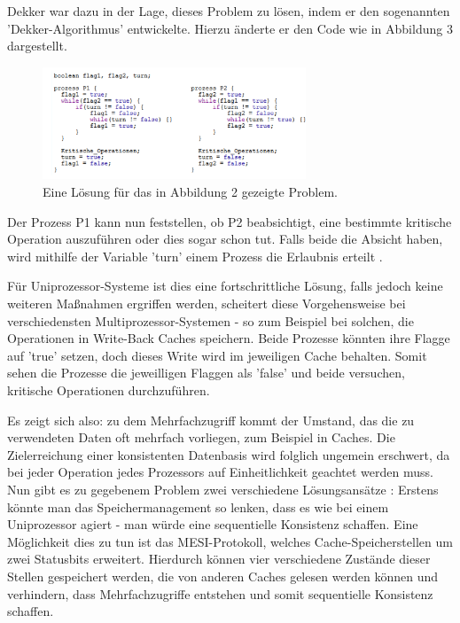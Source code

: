 \documentclass[final,bibliography=totocnumbered]{include/sikseminar}
\begin{document}
Dekker war dazu in der Lage, dieses Problem zu lösen, indem er den sogenannten 'Dekker-Algorithmus' entwickelte.
Hierzu änderte er den Code wie in Abbildung 3 dargestellt.
\begin{figure}[htbp] %
  \centering
  \includegraphics[width=0.7\textwidth]{figures/problem2}
  \caption{Eine Lösung für das in Abbildung 2 gezeigte Problem.}
  \label{Fig:problem2}
\end{figure}

Der Prozess P1 kann nun feststellen, ob P2 beabsichtigt, eine bestimmte kritische Operation auszuführen oder dies sogar schon tut.
Falls beide die Absicht haben, wird mithilfe der Variable 'turn' einem Prozess die Erlaubnis erteilt \cite{ocofwmcm}.

Für Uniprozessor-Systeme ist dies eine fortschrittliche Lösung, falls jedoch keine weiteren Maßnahmen ergriffen werden, scheitert diese Vorgehensweise bei verschiedensten Multiprozessor-Systemen - so zum Beispiel bei solchen, die Operationen in Write-Back Caches speichern.
Beide Prozesse könnten ihre Flagge auf 'true' setzen, doch dieses Write wird im jeweiligen Cache behalten. Somit sehen die Prozesse die jeweilligen Flaggen als 'false' und beide versuchen, kritische Operationen durchzuführen\cite{ocofwmcm}. 


Es zeigt sich also: zu dem Mehrfachzugriff kommt der Umstand, das die zu verwendeten Daten oft mehrfach vorliegen, zum Beispiel in Caches.
Die Zielerreichung einer konsistenten Datenbasis wird folglich ungemein erschwert, da bei jeder Operation jedes Prozessors auf Einheitlichkeit geachtet werden muss.
Nun gibt es zu gegebenem Problem zwei verschiedene Lösungsansätze \cite{ocofwmcm}:
Erstens könnte man das Speichermanagement so lenken, dass es wie bei einem Uniprozessor agiert - man würde eine sequentielle Konsistenz schaffen.
Eine Möglichkeit dies zu tun ist das MESI-Protokoll, welches Cache-Speicherstellen um zwei Statusbits erweitert.
Hierdurch können vier verschiedene Zustände dieser Stellen gespeichert werden, die von anderen Caches gelesen werden können und verhindern,
dass Mehrfachzugriffe entstehen und somit sequentielle Konsistenz schaffen\cite{gpucc}.
\end{document}
